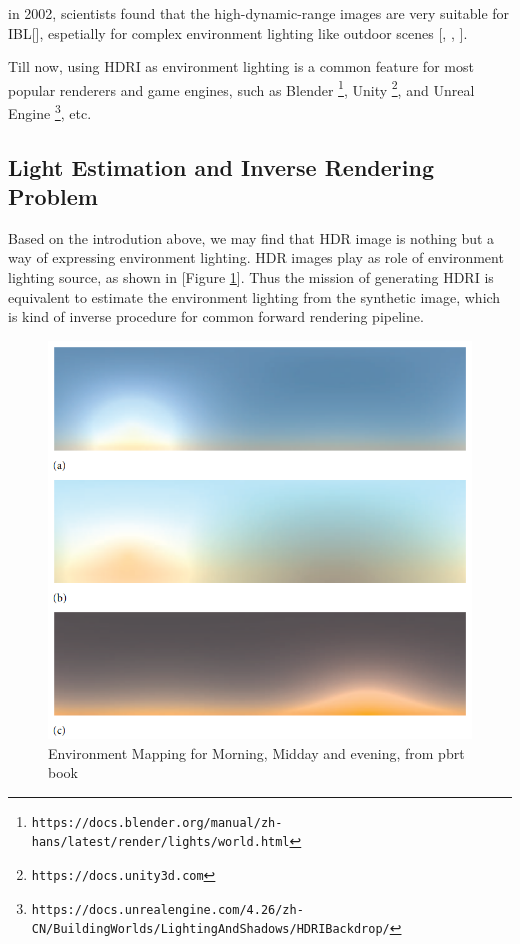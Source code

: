 \documentclass{article}
\begin{document}
in 2002, scientists found that the high-dynamic-range images are very suitable
for IBL[\cite{debevecRenderingSyntheticObjects1998}], espetially for complex environment lighting like outdoor scenes
    [\cite{durandFastBilateralFiltering2002},
        \cite{fattalGradientDomainHigh2002},
        \cite{reinhardPhotographicToneReproduction2002}].

Till now, using HDRI as environment lighting is a common feature for most popular
renderers and game engines, such as
Blender \footnote{\texttt{https://docs.blender.org/manual/zh-hans/latest/render/lights/world.html}},
Unity \footnote{\texttt{https://docs.unity3d.com}},
and Unreal Engine \footnote{\texttt{https://docs.unrealengine.com/4.26/zh-CN/BuildingWorlds/LightingAndShadows/HDRIBackdrop/}}, etc.

\subsection{Light Estimation and Inverse Rendering Problem}

Based on the introdution above, we may find that HDR image is nothing but a way
of expressing environment lighting. HDR images play as role of environment lighting source,
as shown in [Figure \ref{fig:environment-map}]. Thus the mission of generating HDRI is equivalent to
estimate the environment lighting from the synthetic image,
which is kind of inverse procedure for common forward rendering pipeline.

\begin{figure}
    \centering
    \includegraphics[width=0.6\linewidth]{environment-map.png}
    \caption{Environment Mapping for Morning, Midday and evening, from pbrt book}
    \label{fig:environment-map}
\end{figure}
\end{document}
